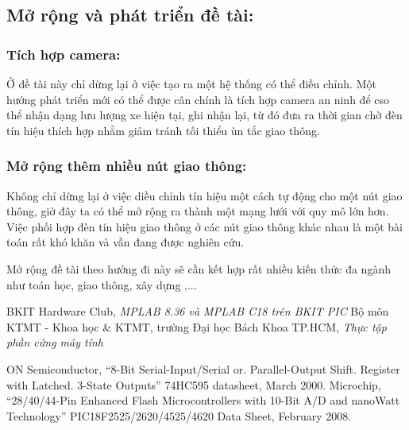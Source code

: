 \documentclass[a4paper]{article}
\begin{document}
\subsection{Mở rộng và phát triển đề tài:}
\subsubsection{Tích hợp camera:}
Ở đề tài này chỉ dừng lại ở việc tạo ra một hệ thống có thể điều chỉnh. Một hướng phát triển mới có thể được cân chính là tích hợp camera an ninh để cso thể nhận dạng lưu lượng xe hiện tại, ghi nhận lại, từ đó đưa ra thời gian chờ đèn tín hiệu thích hợp nhằm giảm tránh tối thiểu ùn tắc giao thông.
\subsubsection{Mở rộng thêm nhiều nút giao thông:}
Không chỉ dừng lại ở việc diều chỉnh tín hiệu một cách tự động cho một nút giao thông, giờ đây ta có thể mở rộng ra thành một mạng lưới với quy mô lớn hơn.
Việc phối hợp đèn tín hiệu giao thông ở các nút giao thông khác nhau là một bài toán rất khó khăn và vẫn đang được nghiên cứu. 

Mở rộng đề tài theo hướng đi này sẽ cần kết hợp rất nhiều kiến thức đa ngành như toán học, giao thông, xây dựng ,...
\begin{thebibliography}{80}


BKIT Hardware Club, \textit{MPLAB 8.36 và MPLAB C18 trên BKIT PIC}
Bộ môn KTMT - Khoa học \& KTMT, trường Đại học Bách Khoa TP.HCM, \textit{Thực tập phần cứng máy tính}

 ON Semiconductor, “8-Bit Serial-Input/Serial or. Parallel-Output Shift. Register with Latched. 3-State Outputs” 74HC595 datasheet, March 2000.
 Microchip, “28/40/44-Pin Enhanced Flash Microcontrollers with 10-Bit A/D and nanoWatt Technology” PIC18F2525/2620/4525/4620 Data Sheet, February 2008.

\end{thebibliography}
\end{document}
